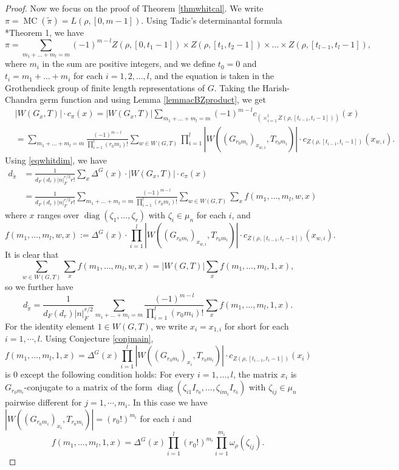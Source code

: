 \documentclass{amsart}
\numberwithin{equation}{section}
\newcommand{\abs}[1]{\left|#1\right|_{F}}
\newcommand{\car}[1]{\left|#1\right|}
\newcommand{\mrdiag}{\operatorname{diag}}
\newcommand{\mrmc}{\operatorname{MC}}
\newcommand{\dF}[1]{d_{F}(#1)}
\newcommand{\wt}[1]{\widetilde{#1}}
\begin{document}
\begin{proof}
			Now we focus on the proof of Theorem \ref{thmwhitcal}. We write $\pi=\mrmc(\wt{\pi})=L(\rho,[0,m-1])$. Using Tadic's determinantal formula \cite{lapid2014determinantal}*{Theorem 1}, we have
			$$\pi=\sum_{m_{1}+\dots+m_{l}=m}(-1)^{m-l}Z(\rho,[0,t_{1}-1])\times Z(\rho,[t_{1},t_{2}-1])\times\dots\times Z(\rho,[t_{l-1},t_{l}-1]),$$
			where $m_{i}$ in the sum are positive integers, and we define $t_{0}=0$ and $t_{i}=m_{1}+\dots+m_{i}$ for each $i=1,2,\dots,l$, and the equation is taken in the Grothendieck group of finite length representations of $G$. Taking the Harish-Chandra germ function and using Lemma \ref{lemmacBZproduct}, we get
			\begin{align*}&\car{W(G_{x},T)}\cdot c_{\pi}(x)=\car{W(G_{x},T)}\sum_{m_{1}+\dots+m_{l}=m}(-1)^{m-l}c_{(\times_{i=1}^{l}Z(\rho,[t_{i-1},t_{i}-1]))}(x)\\
				&=\sum_{m_{1}+\dots+m_{l}=m}\frac{(-1)^{m-l}}{\prod_{i=1}^{l}(r_{0}m_{i})!}\sum_{w\in W(G,T)}\prod_{i=1}^{l}\car{W((G_{r_{0}m_{i}})_{x_{w,i}},T_{r_{0}m_{i}})}\cdot c_{Z(\rho,[t_{i-1},t_{i}-1])}(x_{w,i}).
			\end{align*}
			Using \eqref{eqwhitdim}, we have
			\begin{align*}
				d_{\wt{\pi}}&=\frac{1}{\dF{d_{r}}\abs{n}^{r/2}r!}\sum_{x}\Delta^{G}(x)\cdot\car{W(G_{x},T)}\cdot c_{\pi}(x)\\
				&=\frac{1}{\dF{d_{r}}\abs{n}^{r/2}r!}\sum_{m_{1}+\dots+m_{l}=m}\frac{(-1)^{m-l}}{\prod_{i=1}^{l}(r_{0}m_{i})!}\sum_{w\in W(G,T)}\sum_{x}f(m_{1},\dots,m_{l},w,x)
			\end{align*}
			where $x$ ranges over $\mrdiag(\zeta_{1},\dots,\zeta_{r})$ with $\zeta_{i}\in\mu_{n}$ for each $i$, and $$f(m_{1},\dots,m_{l},w,x):=\Delta^{G}(x)\cdot\prod_{i=1}^{l}\car{W((G_{r_{0}m_{i}})_{x_{w,i}},T_{r_{0}m_{i}})}\cdot c_{Z(\rho,[t_{i-1},t_{i}-1])}(x_{w,i}).$$
			It is clear that
			$$\sum_{w\in W(G,T)}\sum_{x}f(m_{1},\dots,m_{l},w,x)=\car{W(G,T)}\sum_{x}f(m_{1},\dots,m_{l},1,x),$$
			so we further have
			\begin{equation}\label{eqdtildepi}
				d_{\wt{\pi}}=\frac{1}{\dF{d_{r}}\abs{n}^{r/2}}\sum_{m_{1}+\dots+m_{l}=m}\frac{(-1)^{m-l}}{\prod_{i=1}^{l}(r_{0}m_{i})!}\sum_{x}f(m_{1},\dots,m_{l},1,x).
			\end{equation}
			For the identity element $1\in W(G,T)$, we write $x_{i}=x_{1,i}$ for short for each $i=1,\cdots,l$. Using Conjecture \ref{conjmain}, 
			$$f(m_{1},\dots,m_{l},1,x)=\Delta^{G}(x)\prod_{i=1}^{l}\car{W((G_{r_{0}m_{i}})_{x_{i}},T_{r_{0}m_{i}})}\cdot c_{Z(\rho,[t_{i-1},t_{i}-1])}(x_{i})$$
			is 0 except the following condition holds: For every $i=1,\dots,l$, the matrix $x_{i}$ is $G_{r_{0}m_{i}}$-conjugate to a matrix of the form $\mrdiag(\zeta_{i1}I_{r_{0}},\dots,\zeta_{im_{i}}I_{r_{0}})$ with $\zeta_{ij}\in\mu_{n}$ pairwise different for $j=1,\cdots,m_{i}$. In this case we have $\car{W((G_{r_{0}m_{i}})_{x_{i}},T_{r_{0}m_{i}})}=(r_{0}!)^{m_{i}}$ for each $i$ and $$f(m_{1},\dots,m_{l},1,x)=\Delta^{G}(x) \prod_{i=1}^{l}(r_{0}!)^{m_{i}}\prod_{i=1}^{m_{i}}\omega_{\rho}(\zeta_{ij}).$$ 
			

\end{proof}
\end{document}
